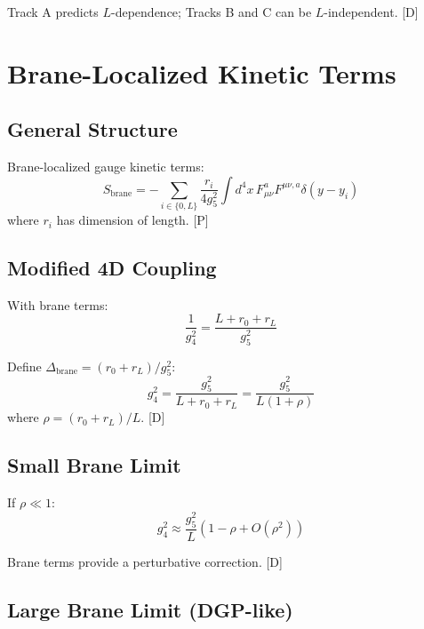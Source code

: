 \documentclass[11pt,a4paper]{article}
\newcommand{\tagD}{\textcolor{blue!70!black}{[D]}}
\newcommand{\tagP}{\textcolor{green!50!black}{[P]}}
\begin{document}
Track A predicts $L$-dependence; Tracks B and C can be $L$-independent. \tagD

\section{Brane-Localized Kinetic Terms}

\subsection{General Structure}

Brane-localized gauge kinetic terms:
\begin{equation}
\label{eq:brane-kinetic}
S_{\text{brane}} = -\sum_{i \in \{0,L\}} \frac{r_i}{4g_5^2} \int d^4x\, F_{\mu\nu}^a F^{\mu\nu,a} \delta(y - y_i)
\end{equation}
where $r_i$ has dimension of length. \tagP

\subsection{Modified 4D Coupling}

With brane terms:
\begin{equation}
\label{eq:g4-brane}
\frac{1}{g_4^2} = \frac{L + r_0 + r_L}{g_5^2}
\end{equation}

Define $\Delta_{\text{brane}} = (r_0 + r_L)/g_5^2$:
\begin{equation}
\label{eq:g4-delta}
g_4^2 = \frac{g_5^2}{L + r_0 + r_L} = \frac{g_5^2}{L(1 + \rho)}
\end{equation}
where $\rho = (r_0 + r_L)/L$. \tagD

\subsection{Small Brane Limit}

If $\rho \ll 1$:
\begin{equation}
\label{eq:small-brane}
g_4^2 \approx \frac{g_5^2}{L}(1 - \rho + O(\rho^2))
\end{equation}

Brane terms provide a perturbative correction. \tagD

\subsection{Large Brane Limit (DGP-like)}
\end{document}
